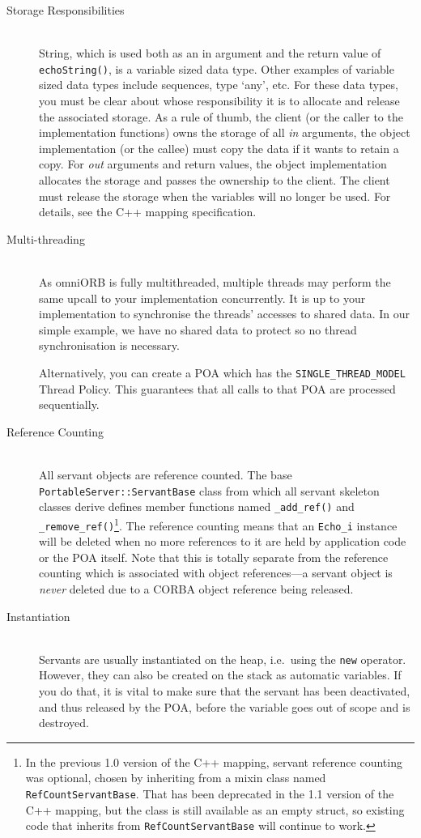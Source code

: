 \documentclass[11pt,oneside,a4paper]{book}
\newcommand{\type}[1]{\texttt{#1}}
\newcommand{\code}[1]{\texttt{#1}}
\newcommand{\op}[1]{\texttt{#1()}}
\newcommand{\dsc}{\discretionary{}{}{}}
\begin{document}
\begin{description}

\item[Storage Responsibilities]\mbox{}\\
%
String, which is used both as an in argument and the return value of
\op{echoString}, is a variable sized data type. Other examples of
variable sized data types include sequences, type `any', etc. For
these data types, you must be clear about whose responsibility it is
to allocate and release the associated storage. As a rule of thumb,
the client (or the caller to the implementation functions) owns the
storage of all \emph{in} arguments, the object implementation (or the
callee) must copy the data if it wants to retain a copy. For
\emph{out} arguments and return values, the object implementation
allocates the storage and passes the ownership to the client. The
client must release the storage when the variables will no longer be
used.  For details, see the C++ mapping specification.

\item[Multi-threading]\mbox{}\\
%
As omniORB is fully multithreaded, multiple threads may perform the
same upcall to your implementation concurrently. It is up to your
implementation to synchronise the threads' accesses to shared data.
In our simple example, we have no shared data to protect so no thread
synchronisation is necessary.

Alternatively, you can create a POA which has the
\code{SINGLE\_THREAD\_MODEL} Thread Policy. This guarantees that all
calls to that POA are processed sequentially.

\item[Reference Counting]\mbox{}\\
%
All servant objects are reference counted. The base
\type{PortableServer::\dsc{}ServantBase} class from which all servant
skeleton classes derive defines member functions named \op{\_add\_ref}
and \op{\_remove\_ref}\footnote{In the previous 1.0 version of the C++
mapping, servant reference counting was optional, chosen by inheriting
from a mixin class named \type{RefCountServantBase}. That has been
deprecated in the 1.1 version of the C++ mapping, but the class is
still available as an empty struct, so existing code that inherits
from \type{RefCountServantBase} will continue to work.}. The reference
counting means that an \type{Echo\_i} instance will be deleted when no
more references to it are held by application code or the POA
itself. Note that this is totally separate from the reference counting
which is associated with object references---a servant object is
\emph{never} deleted due to a CORBA object reference being released.

\item[Instantiation]\mbox{}\\
%
Servants are usually instantiated on the heap, i.e.\ using the
\code{new} operator. However, they can also be created on the stack as
automatic variables. If you do that, it is vital to make sure that the
servant has been deactivated, and thus released by the POA, before the
variable goes out of scope and is destroyed.

\end{description}
\end{document}
